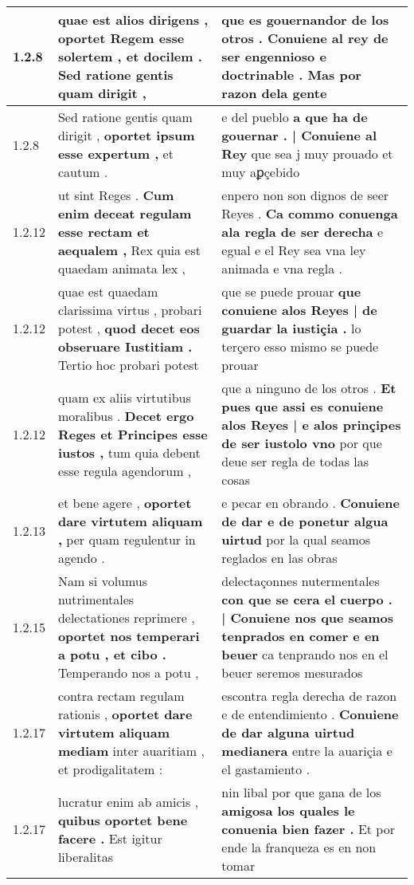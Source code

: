\begin{tabular}{|p{1cm}|p{6.5cm}|p{6.5cm}|}
1.2.8 & quae est alios dirigens , \textbf{ oportet Regem esse solertem , et docilem . } Sed ratione gentis quam dirigit , & que es gouernandor de los otros . \textbf{ Conuiene al rey de ser engennioso e doctrinable . } Mas por razon dela gente \\\hline
1.2.8 & Sed ratione gentis quam dirigit , \textbf{ oportet ipsum esse expertum , } et cautum . & e del pueblo \textbf{ a que ha de gouernar . | Conuiene al Rey } que sea j muy prouado et muy aꝑçebido \\\hline
1.2.12 & ut sint Reges . \textbf{ Cum enim deceat regulam esse rectam et aequalem , } Rex quia est quaedam animata lex , & enpero non son dignos de seer Reyes . \textbf{ Ca commo conuenga ala regla de ser derecha } e egual e el Rey sea vna ley animada e vna regla . \\\hline
1.2.12 & quae est quaedam clarissima virtus , probari potest , \textbf{ quod decet eos obseruare Iustitiam . } Tertio hoc probari potest & que se puede prouar \textbf{ que conuiene alos Reyes | de guardar la iustiçia . } lo terçero esso mismo se puede prouar \\\hline
1.2.12 & quam ex aliis virtutibus moralibus . \textbf{ Decet ergo Reges et Principes esse iustos , } tum quia debent esse regula agendorum , & que a ninguno de los otros . \textbf{ Et pues que assi es conuiene alos Reyes | e alos prinçipes de ser iustolo vno } por que deue ser regla de todas las cosas \\\hline
1.2.13 & et bene agere , \textbf{ oportet dare virtutem aliquam , } per quam regulentur in agendo . & e pecar en obrando . \textbf{ Conuiene de dar e de ponetur algua uirtud } por la qual seamos reglados en las obras \\\hline
1.2.15 & Nam si volumus nutrimentales delectationes reprimere , \textbf{ oportet nos temperari a potu , et cibo . } Temperando nos a potu , & delectaçonnes nutermentales \textbf{ con que se cera el cuerpo . | Conuiene nos que seamos tenprados en comer e en beuer } ca tenprando nos en el beuer seremos mesurados \\\hline
1.2.17 & contra rectam regulam rationis , \textbf{ oportet dare virtutem aliquam mediam } inter auaritiam , et prodigalitatem : & escontra regla derecha de razon e de entendimiento . \textbf{ Conuiene de dar alguna uirtud medianera } entre la auariçia e el gastamiento . \\\hline
1.2.17 & lucratur enim ab amicis , \textbf{ quibus oportet bene facere . } Est igitur liberalitas & nin libal por que gana de los \textbf{ amigosa los quales le conuenia bien fazer . } Et por ende la franqueza es en non tomar \\\hline

\end{tabular}
